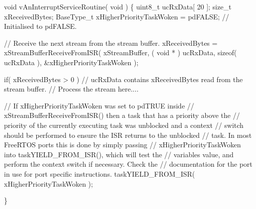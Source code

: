 \begin{DoxyPre}void vAnInterruptServiceRoutine( void )
\{
uint8\_t ucRxData[ 20 ];
size\_t xReceivedBytes;
BaseType\_t xHigherPriorityTaskWoken = pdFALSE;  // Initialised to pdFALSE.
\begin{DoxyVerb}// Receive the next stream from the stream buffer.
xReceivedBytes = xStreamBufferReceiveFromISR( xStreamBuffer,
                                              ( void * ) ucRxData,
                                              sizeof( ucRxData ),
                                              &xHigherPriorityTaskWoken );

if( xReceivedBytes > 0 )
{
    // ucRxData contains xReceivedBytes read from the stream buffer.
    // Process the stream here....
}

// If xHigherPriorityTaskWoken was set to pdTRUE inside
// xStreamBufferReceiveFromISR() then a task that has a priority above the
// priority of the currently executing task was unblocked and a context
// switch should be performed to ensure the ISR returns to the unblocked
// task.  In most FreeRTOS ports this is done by simply passing
// xHigherPriorityTaskWoken into taskYIELD_FROM_ISR(), which will test the
// variables value, and perform the context switch if necessary.  Check the
// documentation for the port in use for port specific instructions.
taskYIELD_FROM_ISR( xHigherPriorityTaskWoken );
\end{DoxyVerb}

\}
\end{DoxyPre}
 
